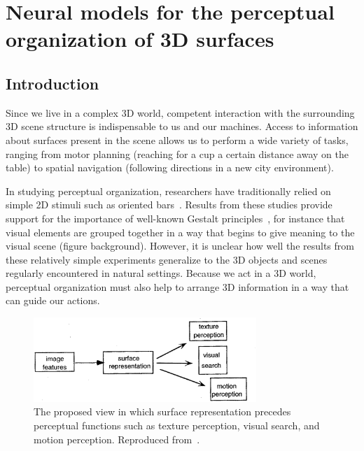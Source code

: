 \chapter{Neural models for the perceptual organization of 3D surfaces}
\label{sec:surfaces}

\section{Introduction}

Since we live in a complex 3D world, competent interaction with the surrounding 3D scene structure is indispensable to us and our machines. Access to information about surfaces present in the scene allows us to perform a wide variety of tasks, ranging from motor planning (\eg reaching for a cup a certain distance away on the table) to spatial navigation (\eg following directions in a new city environment).

In studying perceptual organization, researchers have traditionally relied on simple 2D stimuli such as oriented bars~\citep{Palmer_02}. Results from these studies provide support for the importance of well-known Gestalt principles~\citep{Koffka35, Wertheimer23}, for instance that visual elements are grouped together in a way that begins to give meaning to the visual scene (\eg figure \vs background). However, it is unclear how well the results from these relatively simple experiments generalize to the 3D objects and scenes regularly encountered in natural settings. Because we act in a 3D world, perceptual organization must also help to arrange 3D information in a way that can guide our actions. 

\begin{figure}[t]
\centering
\includegraphics[width=0.75\textwidth]{3D-Surface/figs/nakayama_surface}
\makeatletter
\let\@currsize\normalsize
\caption[Surface representation precedes perceptual visual function]{The proposed view in which surface representation precedes perceptual functions such as texture perception, visual search, and motion perception. Reproduced from~\citet{Nakayama_etal95}.}
\label{NakayamaSurface}
\end{figure}

